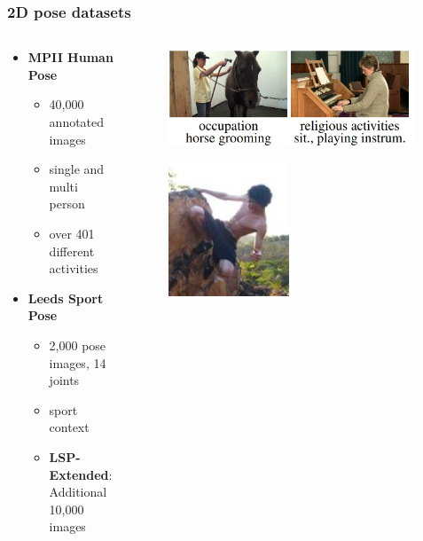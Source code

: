\documentclass[9pt]{beamer}
\newenvironment{myframe}[1][]{%
\begin{frame}%
\frametitle{#1}
\setcounter{footnote}{0}


}{%
\end{frame}%
}
\begin{document}
\begin{myframe}[2D pose datasets]
  \begin{columns}[T]
      \begin{column}{.48\textwidth}
          \begin{itemize}
              \item \textbf{MPII Human Pose\footnotemark}
              \begin{itemize}
                  \item 40,000 annotated images
                  \item single and multi person
                  \item over 401 different activities
              \end{itemize}
              \vspace{50px}
              \item \textbf{Leeds Sport Pose \footnotemark \footnotemark}
              \begin{itemize}
                  \item 2,000 pose images, 14 joints
                  \item sport context
                  \item \textbf{LSP-Extended}: Additional 10,000 images
              \end{itemize}
          \end{itemize}
      \end{column}
      \begin{column}{.48\textwidth}
          \begin{figure}
              \includegraphics[width=0.99\textwidth]{mpii.png}
          \end{figure}
          \begin{figure}
              \includegraphics[width=0.48\textwidth]{lsp-original.jpg}

\end{figure}
\end{column}
\end{columns}
\end{myframe}
\end{document}
